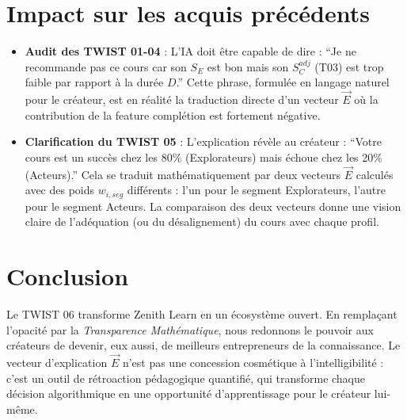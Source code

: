 \documentclass[11pt,a4paper]{article}
\begin{document}
\section{Impact sur les acquis précédents}
\begin{itemize}
    \item \textbf{Audit des TWIST 01-04} : L'IA doit être capable de dire : ``Je ne recommande pas ce cours car son $S_E$ est bon mais son $S_C^{adj}$ (T03) est trop faible par rapport à la durée $D$.'' Cette phrase, formulée en langage naturel pour le créateur, est en réalité la traduction directe d'un vecteur $\vec{E}$ où la contribution de la feature complétion est fortement négative.
    \item \textbf{Clarification du TWIST 05} : L'explication révèle au créateur : ``Votre cours est un succès chez les 80\% (Explorateurs) mais échoue chez les 20\% (Acteurs).'' Cela se traduit mathématiquement par deux vecteurs $\vec{E}$ calculés avec des poids $w_{i,seg}$ différents : l'un pour le segment Explorateurs, l'autre pour le segment Acteurs. La comparaison des deux vecteurs donne une vision claire de l'adéquation (ou du désalignement) du cours avec chaque profil.
\end{itemize}

\section{Conclusion}
Le TWIST 06 transforme Zenith Learn en un écosystème ouvert. En remplaçant l'opacité par la \textit{Transparence Mathématique}, nous redonnons le pouvoir aux créateurs de devenir, eux aussi, de meilleurs entrepreneurs de la connaissance. Le vecteur d'explication $\vec{E}$ n'est pas une concession cosmétique à l'intelligibilité : c'est un outil de rétroaction pédagogique quantifié, qui transforme chaque décision algorithmique en une opportunité d'apprentissage pour le créateur lui-même.
\end{document}
